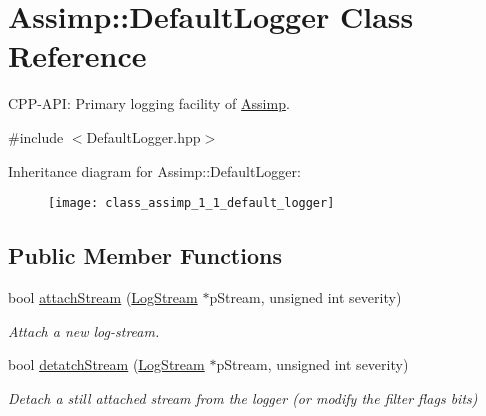 \hypertarget{class_assimp_1_1_default_logger}{}\section{Assimp\+:\+:Default\+Logger Class Reference}
\label{class_assimp_1_1_default_logger}


C\+P\+P-\/\+A\+PI\+: Primary logging facility of \hyperlink{namespace_assimp}{Assimp}.  




{\ttfamily \#include $<$Default\+Logger.\+hpp$>$}

Inheritance diagram for Assimp\+:\+:Default\+Logger\+:\begin{figure}[H]
\begin{center}
\leavevmode
\texttt{[image: class\_assimp\_1\_1\_default\_logger]}
\end{center}
\end{figure}
\subsection*{Public Member Functions}
\begin{DoxyCompactItemize}
\item 
bool \hyperlink{class_assimp_1_1_default_logger_abc0ca7a337f8c3e38eca0eb45bb1ccf0}{attach\+Stream} (\hyperlink{class_assimp_1_1_log_stream}{Log\+Stream} $\ast$p\+Stream, unsigned int severity)
\begin{DoxyCompactList}\small\item\em Attach a new log-\/stream. \end{DoxyCompactList}\item 
bool \hyperlink{class_assimp_1_1_default_logger_a2615f1d1624f1d742d0cf2dd4a5cccc8}{detatch\+Stream} (\hyperlink{class_assimp_1_1_log_stream}{Log\+Stream} $\ast$p\+Stream, unsigned int severity)
\begin{DoxyCompactList}\small\item\em Detach a still attached stream from the logger (or modify the filter flags bits) \end{DoxyCompactList}\end{DoxyCompactItemize}
